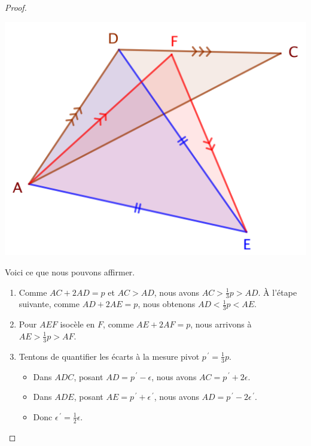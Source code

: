 \begin{proof}
	\begin{center}
		\includegraphics[scale=.4]{content/triangle-gene/proof-focus.png}
	\end{center} 
	

	Voici ce que nous pouvons affirmer.
	\begin{enumerate}
		\item Comme $AC + 2 AD = p$ et $AC > AD$, nous avons $AC > \frac13 p > AD$.
		À l'étape suivante, comme $AD + 2 AE = p$, nous obtenons $AD < \frac13 p < AE$.


		\item Pour $AEF$ isocèle en $F$, comme $AE + 2AF = p$, nous arrivons à  $AE > \frac13 p > AF$.
		
		
		\item \label{tri-equi-conv}
		Tentons de quantifier les écarts à la mesure pivot $p^{\,\prime} = \frac13 p$. 
		\begin{itemize}
			\item Dans $ADC$, posant $AD = p^{\,\prime} - \epsilon$, nous avons $AC = p^{\,\prime} + 2 \epsilon$.

			\item Dans $ADE$, posant $AE = p^{\,\prime} + \epsilon^{\,\prime}$, nous avons $AD = p^{\,\prime} - 2 \epsilon^{\,\prime}$.

			\item Donc $\epsilon^{\,\prime} = \frac12 \epsilon$.
		\end{itemize}
	\end{enumerate}


	\smallskip
	

\end{proof}
